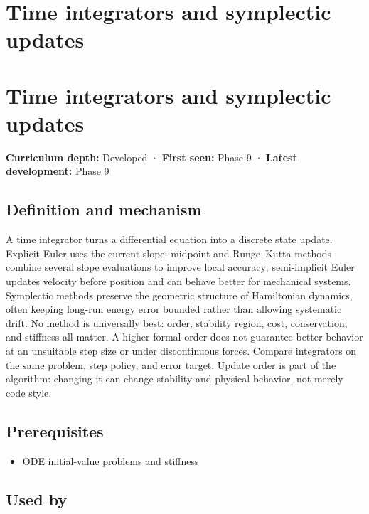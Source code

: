 \hypertarget{appendix-8f96f9c4d5bc}{}
\section*{Time integrators and symplectic updates}
\section{Time integrators and symplectic updates}\label{appendix-8f96f9c4d5bc-time-integrators-and-symplectic-updates}

\textbf{Curriculum depth:} Developed · \textbf{First seen:} Phase 9 · \textbf{Latest development:} Phase 9

\subsection{Definition and mechanism}\label{appendix-8f96f9c4d5bc-definition-and-mechanism}

A time integrator turns a differential equation into a discrete state update. Explicit Euler uses the current slope; midpoint and Runge--Kutta methods combine several slope evaluations to improve local accuracy; semi-implicit Euler updates velocity before position and can behave better for mechanical systems. Symplectic methods preserve the geometric structure of Hamiltonian dynamics, often keeping long-run energy error bounded rather than allowing systematic drift. No method is universally best: order, stability region, cost, conservation, and stiffness all matter. A higher formal order does not guarantee better behavior at an unsuitable step size or under discontinuous forces. Compare integrators on the same problem, step policy, and error target. Update order is part of the algorithm: changing it can change stability and physical behavior, not merely code style.

\subsection{Prerequisites}\label{appendix-8f96f9c4d5bc-prerequisites}

\begin{itemize}
\tightlist
\item
  \hyperref[appendix-e8ab9836882e]{ODE initial-value problems and stiffness}
\end{itemize}

\subsection{Used by}\label{appendix-8f96f9c4d5bc-used-by}

